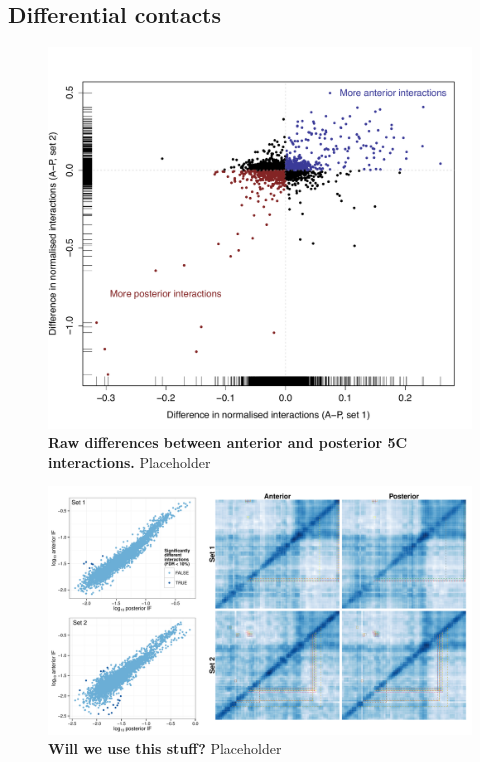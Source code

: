 \documentclass[a4paper,11pt,oneside]{book}
\begin{document}
\subsection{Differential contacts}


\begin{figure}
\begin{center} 
\includegraphics[width=\textwidth]{figs/5cfc.pdf}
\captionsetup{width=\textwidth} 
\caption[Raw differences between anterior and posterior 5C interactions.]{ {\bf Raw differences between anterior and posterior 5C interactions. }
Placeholder
}\label{fig:5cfc}
\end{center} 
\end{figure} 


\begin{figure}
\begin{center} 
\includegraphics[width=\textwidth]{figs/5cdiff.pdf}
\captionsetup{width=\textwidth} 
\caption{ {\bf Will we use this stuff? }
Placeholder
}\label{fig:5cdiff}
\end{center} 
\end{figure} 
\end{document}
